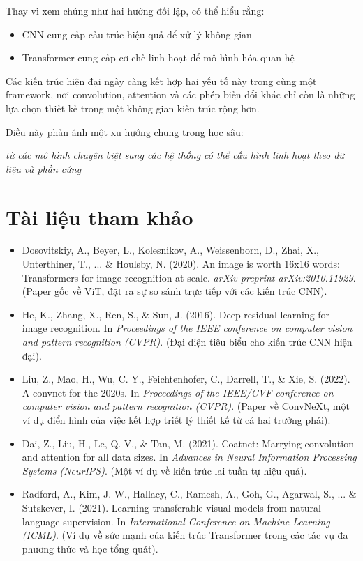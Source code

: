 Thay vì xem chúng như hai hướng đối lập, có thể hiểu rằng:
\begin{itemize}
	\item CNN cung cấp cấu trúc hiệu quả để xử lý không gian
	\item Transformer cung cấp cơ chế linh hoạt để mô hình hóa quan hệ
\end{itemize}

Các kiến trúc hiện đại ngày càng kết hợp hai yếu tố này trong cùng một framework, nơi convolution, attention và các phép biến đổi khác chỉ còn là những lựa chọn thiết kế trong một không gian kiến trúc rộng hơn.

Điều này phản ánh một xu hướng chung trong học sâu:  
\begin{center}
	\textit{từ các mô hình chuyên biệt sang các hệ thống có thể cấu hình linh hoạt theo dữ liệu và phần cứng}
\end{center}

\section*{Tài liệu tham khảo}
\begin{itemize}
	\item[1] Dosovitskiy, A., Beyer, L., Kolesnikov, A., Weissenborn, D., Zhai, X., Unterthiner, T., ... \& Houlsby, N. (2020). An image is worth 16x16 words: Transformers for image recognition at scale. \textit{arXiv preprint arXiv:2010.11929}. (Paper gốc về ViT, đặt ra sự so sánh trực tiếp với các kiến trúc CNN).
	\item[2] He, K., Zhang, X., Ren, S., \& Sun, J. (2016). Deep residual learning for image recognition. In \textit{Proceedings of the IEEE conference on computer vision and pattern recognition (CVPR)}. (Đại diện tiêu biểu cho kiến trúc CNN hiện đại).
	\item[3] Liu, Z., Mao, H., Wu, C. Y., Feichtenhofer, C., Darrell, T., \& Xie, S. (2022). A convnet for the 2020s. In \textit{Proceedings of the IEEE/CVF conference on computer vision and pattern recognition (CVPR)}. (Paper về ConvNeXt, một ví dụ điển hình của việc kết hợp triết lý thiết kế từ cả hai trường phái).
	\item[4] Dai, Z., Liu, H., Le, Q. V., \& Tan, M. (2021). Coatnet: Marrying convolution and attention for all data sizes. In \textit{Advances in Neural Information Processing Systems (NeurIPS)}. (Một ví dụ về kiến trúc lai tuần tự hiệu quả).
	\item[5] Radford, A., Kim, J. W., Hallacy, C., Ramesh, A., Goh, G., Agarwal, S., ... \& Sutskever, I. (2021). Learning transferable visual models from natural language supervision. In \textit{International Conference on Machine Learning (ICML)}. (Ví dụ về sức mạnh của kiến trúc Transformer trong các tác vụ đa phương thức và học tổng quát).
\end{itemize}
